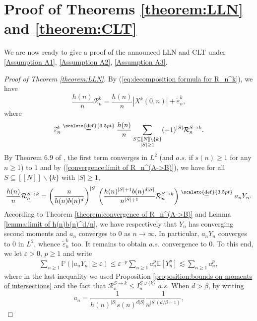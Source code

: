\documentclass[12pt]{article}
\newcommand{\R}{\mathcal R}
\newcommand{\EE}{\mathbb E}
\newcommand{\PP}{\mathbb P}
\newcommand{\1}{\mathds{1}}
\newcommand{\eqdef}{\stackrel{\scaleto{\mathrm{def}}{3.5pt}}{=}}
\numberwithin{equation}{section}
\begin{document}
\section{Proof of Theorems \ref{theorem:LLN} and \ref{theorem:CLT}}
\label{section:proof of main results}

We are now ready to give a proof of the announced LLN and CLT under \ref{Assumption A1}, \ref{Assumption A2}, \ref{Assumption A3}. 
\begin{proof}[Proof of Theorem \ref{theorem:LLN}]
    By (\ref{eq:decomposition formula for R_n^k}), we have
\begin{equation*}
    \frac{h(n)}n\R_n^k=\frac{h(n)}n \left|X^k(0,n)\right|+\widetilde\varepsilon_n^k,
\end{equation*}
where 
\begin{equation*}
    \widetilde\varepsilon_n^k\eqdef\frac{h(n)}n\sum_{\substack{S\subseteq[\![N]\!]\backslash\{k\} \\ |S|\ge 1}}(-1)^{|S|}\R_n^{S\rightarrow k}.
\end{equation*}
By Theorem $6.9$ of \cite{LeGallRosenRangeOfStableRandomWalks1991}, the first term converges in $L^2$ (and $a.s.$ if $s(n)\ge1$ for any $n\ge1$) to $1$ and by (\ref{convergence:limit of R_n^(A->B)}), we have for all $S\subseteq[\![N]\!]\backslash\{k\}$ with $|S|\ge1$,
\begin{equation*}
    \frac{h(n)}{n}\R_n^{S\rightarrow k}=\left(\frac{n}{h(n)b(n)^d}\right)^{|S|}\left(\frac{h(n)^{|S|+1}b(n)^{d|S|}}{n^{|S|+1}}\R_n^{S\rightarrow k}\right)\eqdef a_nY_n.
\end{equation*}
According to Theorem \ref{theorem:convergence of R_n^(A->B)} and Lemma \ref{lemma:limit of h(n)b(n)^d/n}, we have respectively that $Y_n$ has converging second moments and $a_n$ converges to $0$ as $n\rightarrow\infty$. In particular, $a_nY_n$ converges to $0$ in $L^2$, whence $\widetilde\varepsilon_n^k$ too. It remains to obtain $a.s.$ convergence to $0$. To this end, we let $\varepsilon>0$, $p\ge1$ and write
\begin{align*}
    \sum_{n\ge1}\PP\left(|a_n Y_n|\ge\varepsilon\right)\le \varepsilon^{-p}\sum_{n\ge1}a_n^p\EE[Y_n^p]\lesssim\sum_{n\ge1}a_n^p,
\end{align*}
where in the last inequality we used Proposition \ref{proposition:bounds on moments of intersections} and the fact that $\R_n^{S\rightarrow k}\le I_n^{S\cup\{k\}}$ $a.s.$ When $d>\beta$, by writing 
\begin{equation*}
    a_n=\frac{1}{h(n)^{|S|}s(n)^{d|S|}}\frac{1}{n^{|S|(d/\beta-1)}},

\end{equation*}
\end{proof}
\end{document}

